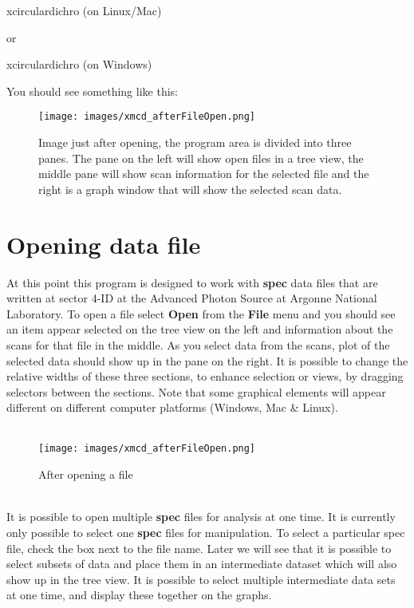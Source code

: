 \documentclass[12pt,letterpaper, openany]{book}
\begin{document}
xcirculardichro    (on Linux/Mac)

or 

xcirculardichro    (on Windows)

You should see something like this: \\
\begin{figure}
\texttt{[image: images/xmcd\_afterFileOpen.png]}
\caption{Image just after opening, the program area is divided into three
panes.  The pane on the left will show open files in a tree view, the middle
pane will show scan information for the selected file and the right is a graph
window that will show the selected scan data.}
\end{figure}

\section{Opening data file}
At this point this program is designed to work with \textbf{spec} data files
that are written at sector 4-ID at the Advanced Photon Source at Argonne
National Laboratory.  To open a file select \textbf{Open} from the \textbf{File}
menu and you should see an item appear selected on the tree view on the left and
information about the scans for that file in the middle.  As you select
data from the scans, plot of the selected data should show up in the pane on the
right.  It is possible to change the relative widths of these three
sections, to enhance selection or views, by dragging selectors between the
sections.  Note that some graphical elements will appear different on different
computer platforms (Windows, Mac \& Linux).  \\
\\
\begin{figure}
\texttt{[image: images/xmcd\_afterFileOpen.png]}
\caption {After opening a file}
\end{figure}
\\
It is possible to open multiple \textbf{spec} files for analysis at one time. 
It is currently only possible to select one \textbf{spec} files for
manipulation.  To select a particular spec file, check the box next to the file
name.  Later we will see that it is possible to select subsets of data and place
them in an intermediate dataset which will also show up in the tree view.  It is
possible to select multiple intermediate data sets at one time, and display
these together on the graphs.
\end{document}
